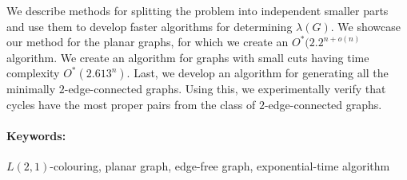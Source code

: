 \documentclass[12pt, oneside]{book}
\begin{document}
We describe methods for splitting the problem into independent smaller parts
and use them to develop faster algorithms for determining $\lambda(G)$.
We showcase our method for the planar graphs, for which we create an $O^*(2.2^{n + o(n)}$
algorithm. We create an algorithm for graphs with small cuts having time complexity
$O^*(2.613^n)$. Last, we develop an algorithm for generating all the minimally $2$-edge-connected
graphs. Using this, we experimentally verify that cycles have the most proper pairs from
the class of $2$-edge-connected graphs.

\paragraph*{Keywords:} $L(2,1)$-colouring, planar graph, edge-free graph, exponential-time algorithm 


%
%



\newpage 

\tableofcontents



\newpage 

\listoffigures


\mainmatter


 











\end{document}
